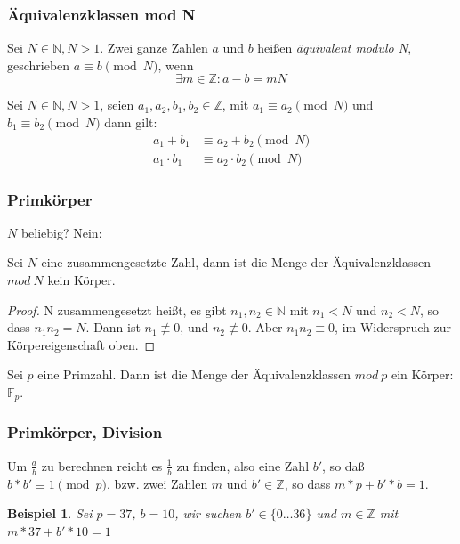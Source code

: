 \documentclass{beamer}
\newcommand{\F}{\mathbb{F}}
\newcommand{\N}{\mathbb{N}}
\newcommand{\Z}{\mathbb{Z}}
\newtheorem{beispiel}[theorem]{Beispiel}
\begin{document}
\begin{frame}
  \frametitle{Äquivalenzklassen mod N}
  \begin{definition}
    Sei $N \in \N, N > 1$. Zwei ganze Zahlen $a$ und $b$ heißen
    \emph{äquivalent modulo N}, geschrieben $a \equiv b \pmod N$, wenn
    $$ \exists m \in \Z: a-b = mN $$
  \end{definition}

  \begin{lemma}
    Sei $N \in \N, N > 1$, seien $a_1, a_2, b_1, b_2 \in \Z$,
    mit $a_1 \equiv a_2 \pmod N$ und $b_1 \equiv b_2 \pmod N$  dann gilt:
    \begin{equation}
      \begin{split}
        \label{op:mod}
        a_1 + b_1 & \equiv  a_2 + b_2 \pmod N \\
        a_1 \cdot b_1 & \equiv  a_2 \cdot b_2 \pmod N
      \end{split}
    \end{equation}
  \end{lemma}
\end{frame}

\begin{frame}
  \frametitle{Primkörper}

  $N$ beliebig? Nein:

  \begin{lemma}
  Sei $N$ eine zusammengesetzte Zahl, dann ist die Menge der
  Äquivalenzklassen $mod\ N$ kein Körper.
  \end{lemma}
  \begin{proof}
    N zusammengesetzt heißt, es gibt $n_1, n_2 \in \N$ mit $n_1 < N$
    und $n_2 < N$, so dass $n_1 n_2 = N$. Dann ist $n_1 \not\equiv 0$, und
    $n_2 \not\equiv 0$. Aber $n_1 n_2 \equiv 0$, im Widerspruch zur
    Körpereigenschaft oben.
  \end{proof}
  \begin{theorem}
    Sei $p$ eine Primzahl. Dann ist die Menge der Äquivalenzklassen $mod\ p$
    ein Körper: $\F_p$.
  \end{theorem}
\end{frame}

\begin{frame}
  \frametitle{Primkörper, Division}
  Um $\frac{a}{b}$ zu berechnen reicht es $\frac 1 b$ zu finden, also eine Zahl
  $b'$, so daß $b * b' \equiv 1 \pmod p$, bzw. zwei Zahlen $m$ und
  $b' \in \Z$, so dass $m * p + b' * b = 1$.
  \begin{beispiel}
    Sei $p = 37$, $b = 10$, wir suchen $b' \in \{0 \ldots 36\}$ und
    $m \in \Z$ mit $m * 37 + b' * 10 = 1$
  \end{beispiel}
\end{frame}
\end{document}
